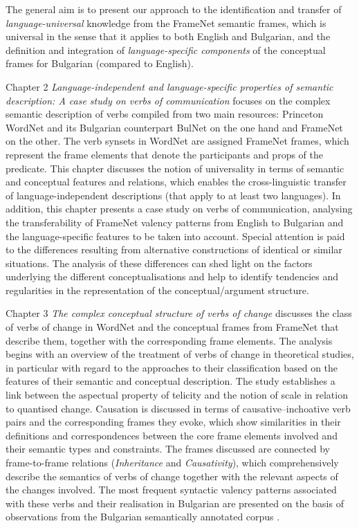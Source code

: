 \begin{refsection}
The general aim is to present our approach to the identification and transfer of \emph{language\hyp universal} knowledge from the FrameNet semantic frames, which is universal in the sense that it applies to both English and Bulgarian, and the definition and integration of \emph{language-specific components} of the conceptual frames for Bulgarian (compared to English).

Chapter 2 \textit{Language-independent and language-specific properties of semantic description: A case study on verbs of communication} focuses on the complex semantic description of verbs compiled from two main resources: Princeton WordNet \citep{Fellbaum1998} and its Bulgarian counterpart BulNet \citep{koeva2021} on the one hand and FrameNet on the other. The verb synsets in WordNet are assigned FrameNet frames, which represent the frame elements that denote the participants and props of the predicate. This chapter discusses the notion of universality in terms of semantic and conceptual features and relations, which enables the cross-linguistic transfer of language-independent descriptions (that apply to at least two languages). In addition, this chapter presents a case study on verbs of communication, analysing the transferability of FrameNet valency patterns from English to Bulgarian and the language-specific features to be taken into account. Special attention is paid to the differences resulting from alternative constructions of identical or similar situations. The analysis of these differences can shed light on the factors underlying the different conceptualisations and help to identify tendencies and regularities in the representation of the conceptual/argument structure.

Chapter 3 \textit{The complex conceptual structure of verbs of change} discusses the class of verbs of change in WordNet \citep{Fellbaum1998} and the conceptual frames from FrameNet \citep{Baker1998} that describe them, together with the corresponding frame elements. The analysis begins with an overview of the treatment of verbs of change in theoretical studies, in particular with regard to the approaches to their classification based on the features of their semantic and conceptual description. The study establishes a link between the aspectual property of telicity and the notion of scale in relation to quantised change. Causation is discussed in terms of causative--inchoative verb pairs and the corresponding frames they evoke, which show similarities in their definitions and correspondences between the core frame elements involved and their semantic types and constraints. The frames discussed are connected by frame-to-frame relations (\textit{Inheritance} and \textit{Causativity}), which comprehensively describe the semantics of verbs of change together with the relevant aspects of the changes involved. The most frequent syntactic valency patterns associated with these verbs and their realisation in Bulgarian are presented on the basis of observations from the Bulgarian semantically annotated corpus \citep{koeva-2011-bulsemcor}.


\end{refsection}

